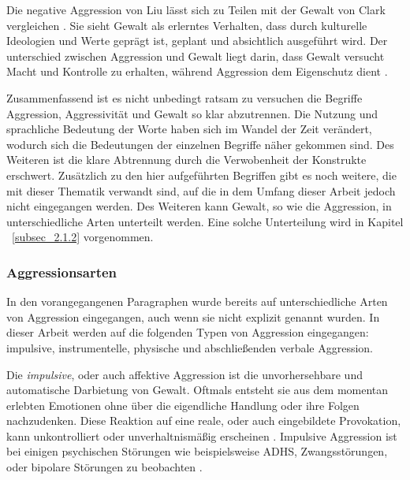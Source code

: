 Die negative Aggression von Liu lässt sich zu Teilen mit der Gewalt von Clark vergleichen \parencite{Def_Aggressivität_vs_violence, Aggression}. Sie sieht Gewalt als erlerntes Verhalten, dass durch kulturelle Ideologien und Werte geprägt ist,  geplant und absichtlich ausgeführt wird. Der unterschied zwischen Aggression und Gewalt liegt darin, dass Gewalt versucht Macht und Kontrolle zu erhalten, während Aggression dem Eigenschutz dient \parencite{Def_Aggressivität_vs_violence}.

Zusammenfassend ist es nicht unbedingt ratsam zu versuchen die Begriffe Aggression, Aggressivität und Gewalt so klar abzutrennen. Die Nutzung und sprachliche Bedeutung der Worte haben sich im Wandel der Zeit verändert, wodurch sich die Bedeutungen der einzelnen Begriffe näher gekommen sind. Des Weiteren ist die klare Abtrennung durch die Verwobenheit der Konstrukte erschwert. Zusätzlich zu den hier aufgeführten Begriffen gibt es noch weitere, die mit dieser Thematik verwandt sind, auf die in dem Umfang dieser Arbeit jedoch nicht eingegangen werden. Des Weiteren kann Gewalt, so wie die Aggression, in unterschiedliche Arten unterteilt werden. Eine solche Unterteilung wird in Kapitel ~\ref{subsec_2.1.2} vorgenommen.



\subsubsection{Aggressionsarten}    \label{subsubsec_2.1.3.1}
In den vorangegangenen Paragraphen wurde bereits auf unterschiedliche Arten von Aggression eingegangen, auch wenn sie nicht explizit genannt wurden. In dieser Arbeit werden auf die folgenden Typen von Aggression eingegangen: impulsive, instrumentelle, physische und abschließenden verbale Aggression.

Die \textit{impulsive}, oder auch affektive Aggression ist die unvorhersehbare und automatische Darbietung von Gewalt. Oftmals entsteht sie aus dem momentan erlebten Emotionen ohne über die eigendliche Handlung oder ihre Folgen nachzudenken. Diese Reaktion auf eine reale, oder auch eingebildete Provokation, kann unkontrolliert oder unverhaltnismäßig erscheinen \parencite{impulsive_instrumental_aggro_healtline, impulsive_aggro}. Impulsive Aggression ist bei einigen psychischen Störungen wie beispielsweise ADHS, Zwangsstörungen, oder bipolare Störungen zu beobachten \parencite{impulsive_aggro_psych_Störung}.

